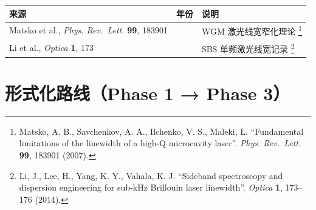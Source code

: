 \documentclass[
  11pt,
  a4paper,
]{ctexrep}
\newcounter{none} %
\begin{document}
{\def\LTcaptype{none} %
\begin{longtable}[]{@{}
  >{\raggedright\arraybackslash}p{}
  >{\centering\arraybackslash}p{}
  >{\raggedright\arraybackslash}p{}@{}}
\toprule\noalign{}
\begin{minipage}[b]{\linewidth}\raggedright
来源
\end{minipage} & \begin{minipage}[b]{\linewidth}\centering
年份
\end{minipage} & \begin{minipage}[b]{\linewidth}\raggedright
说明
\end{minipage} \\
\midrule\noalign{}
\endhead
\bottomrule\noalign{}
\endlastfoot
Matsko et al., \emph{Phys. Rev.~Lett.} \textbf{99}, 183901 & 2007 & WGM
激光线宽窄化理论 \footnote{Matsko, A. B., Savchenkov, A. A., Ilchenko,
  V. S., Maleki, L. ``Fundamental limitations of the linewidth of a
  high-Q microcavity laser''. \emph{Phys. Rev.~Lett.} \textbf{99},
  183901 (2007).} \\
Li et al., \emph{Optica} \textbf{1}, 173 & 2014 & SBS 单频激光线宽记录
\footnote{Li, J., Lee, H., Yang, K. Y., Vahala, K. J. ``Sideband
  spectroscopy and dispersion engineering for sub-kHz Brillouin laser
  linewidth''. \emph{Optica} \textbf{1}, 173--176 (2014).} \\
\end{longtable}
}

\section{形式化路线（Phase 1 → Phase
3）}\label{ux5f62ux5f0fux5316ux8defux7ebfphase-1-phase-3}
\end{document}
